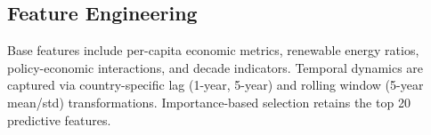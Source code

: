 \documentclass[conference]{IEEEtran}
\begin{document}



\subsection{Feature Engineering}

Base features include per-capita economic metrics, renewable energy ratios,
policy-economic interactions, and decade indicators. Temporal dynamics are
captured via country-specific lag (1-year, 5-year) and rolling window (5-year
mean/std) transformations. Importance-based selection retains the top 20
predictive features.
\end{document}
